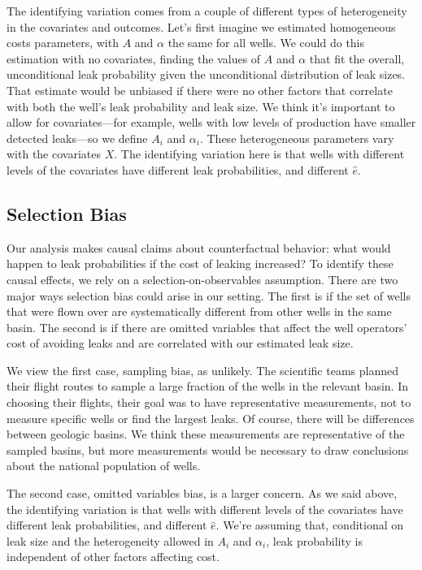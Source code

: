 \documentclass[12pt,oneside,letterpaper]{article}
\theoremstyle{definition}
\begin{document}
\begin{refsection}
The identifying variation comes from a couple of different types of heterogeneity in the covariates and outcomes.
Let's first imagine we estimated homogeneous costs parameters, with \(A\) and \(\alpha\) the same for all wells.
We could do this estimation with no covariates, finding the values of \(A\) and \(\alpha\) that fit the overall, unconditional leak probability given the unconditional distribution of leak sizes.
That estimate would be unbiased if there were no other factors that correlate with both the well's leak probability and leak size.
We think it's important to allow for covariates---for example, wells with low levels of production have smaller detected leaks---so we define \(A_i\) and \(\alpha_i\).
These heterogeneous parameters vary with the covariates \(X\).
The identifying variation here is that wells with different levels of the covariates have different leak probabilities, and different \(\hat{e}\).

\subsection{Selection Bias}
\label{sec:selection-bias}

Our analysis makes causal claims about counterfactual behavior: what would happen to leak probabilities if the cost of leaking increased?
To identify these causal effects, we rely on a selection-on-observables assumption.
There are two major ways selection bias could arise in our setting.
The first is if the set of wells that were flown over are systematically different from other wells in the same basin.
The second is if there are omitted variables that affect the well operators' cost of avoiding leaks and are correlated with our estimated leak size.


We view the first case, sampling bias, as unlikely.
The scientific teams planned their flight routes to sample a large fraction of the wells in the relevant basin.
In choosing their flights, their goal was to have representative measurements, not to measure specific wells or find the largest leaks.
Of course, there will be differences between geologic basins.
We think these measurements are representative of the sampled basins, but more measurements would be necessary to draw conclusions about the national population of wells.

The second case, omitted variables bias, is a larger concern.
As we said above, the identifying variation is that wells with different levels of the covariates have different leak probabilities, and different \(\hat{e}\).
We're assuming that, conditional on leak size and the heterogeneity allowed in  \(A_i\) and \(\alpha_i\), leak probability is independent of other factors affecting cost.


\end{refsection}
\end{document}

